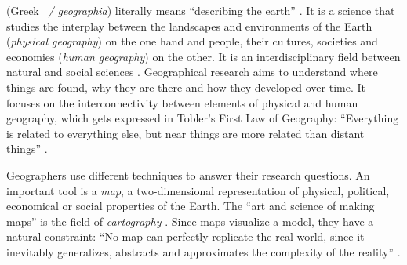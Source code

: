 (Greek ~\emph{\textgamma\textepsilon\textomega\textgamma\textrho\textalpha\textphi\textiota\textalpha / geographia}) literally means ``describing the earth''
\cite{dict}.
It is a science that studies the interplay between the landscapes and environments of the Earth (\emph{physical geography}) on the one hand and people, their cultures, societies and economies (\emph{human geography}) on the other. It is an interdisciplinary field between natural and social sciences
\cite{rgsGeography}. Geographical research aims to understand where things are found, why they are there and how they developed over time. It focuses on the interconnectivity between elements of physical and human geography, which gets expressed in Tobler's First Law of Geography: ``Everything is related to everything else, but near things are more related than distant things''
\cite{lawOfGeography}.

Geographers use different techniques to answer their research questions. An important tool is a \emph{map}, a two-dimensional representation of physical, political, economical or social properties of the Earth. The ``art and science of making maps'' is the field of \emph{cartography} \cite{cartography}. Since maps visualize a model, they have a natural constraint: ``No map can perfectly replicate the real world, since it inevitably generalizes, abstracts and approximates the complexity of the reality''
\cite[p. 181]{knowles2008placing}.



\vspace{1em}

